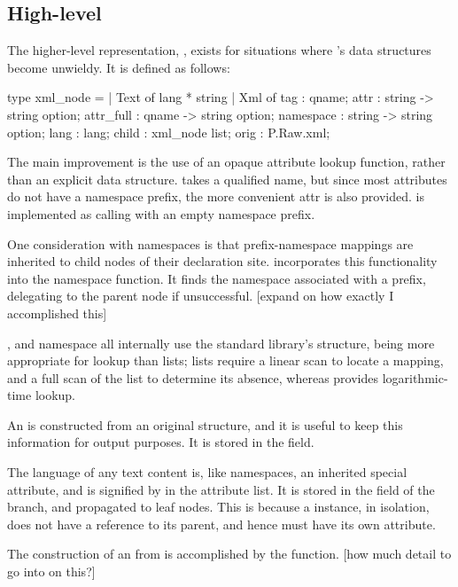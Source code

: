 \documentclass[12pt,a4paper,twoside,openright]{report}
\begin{document}
{\subsection{High-level }
The higher-level representation, , exists for situations where 's data structures become unwieldy. It is defined as follows:

\begin{ocaml}
type xml_node =
| Text of lang * string
| Xml of {
  tag    : qname;
  attr   : string -> string option;
  attr_full : qname -> string option;
  namespace : string -> string option;
  lang  : lang;
  child : xml_node list;
  orig  : P.Raw.xml;
}
\end{ocaml}

The main improvement is the use of an opaque attribute lookup function, rather than an explicit data structure.  takes a qualified name, but since most attributes do not have a namespace prefix, the more convenient attr is also provided.  is implemented as calling  with an empty namespace prefix.

One consideration with namespaces is that prefix-namespace mappings are inherited to child nodes of their declaration site.  incorporates this functionality into the namespace function. It finds the namespace associated with a prefix, delegating to the parent node if unsuccessful. [expand on how exactly I accomplished this]

,  and namespace all internally use the standard library's  structure, being more appropriate for lookup than lists; lists require a linear scan to locate a mapping, and a full scan of the list to determine its absence, whereas  provides logarithmic-time lookup.

An  is constructed from an original  structure, and it is useful to keep this information for output purposes. It is stored in the  field.

The language of any text content is, like namespaces, an inherited special attribute, and is signified by  in the attribute list. It is stored in the  field of the branch, and propagated to leaf  nodes. This is because a  instance, in isolation, does not have a reference to its parent, and hence must have its own  attribute.

The construction of an  from  is accomplished by the  function. [how much detail to go into on this?]

}
\end{document}
